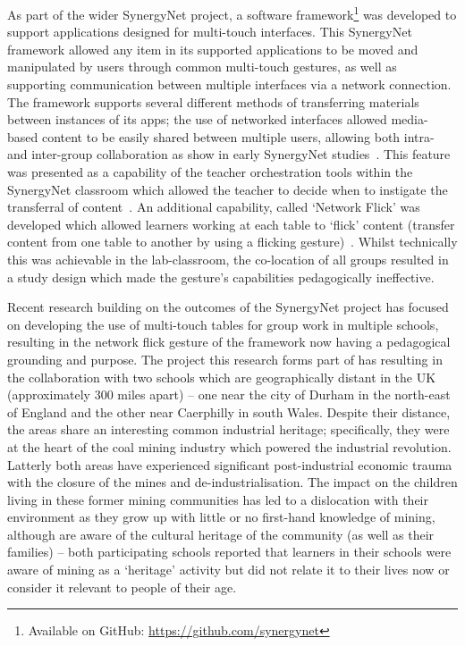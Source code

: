 \documentclass[a4paper,11pt]{article}
\begin{document}
As part of the wider SynergyNet project, a software framework\footnote{Available on GitHub: \url{https://github.com/synergynet}} was developed to support applications designed for multi-touch interfaces.
This SynergyNet framework allowed any item in its supported applications to be moved and manipulated by users through common multi-touch gestures, as well as supporting communication between multiple interfaces via a network connection.
The framework supports several different methods of transferring materials between instances of its apps; the use of networked interfaces allowed media-based content to be easily shared between multiple users, allowing both intra- and inter-group collaboration as show in early SynergyNet studies~\cite{mercier:2014b}.
This feature was presented as a capability of the teacher orchestration tools within the SynergyNet classroom which allowed the teacher to decide when to instigate the transferral of content~\cite{alagha-et-al:2010,mercier:2016}.
An additional capability, called `Network Flick' was developed which allowed learners working at each table to ‘flick’ content (transfer content from one table to another by using a flicking gesture)~\cite{reetz-et-al:2006}.
Whilst technically this was achievable in the lab-classroom, the co-location of all groups resulted in a study design which made the gesture’s capabilities pedagogically ineffective.

Recent research building on the outcomes of the SynergyNet project has focused on developing the use of multi-touch tables for group work in multiple schools, resulting in the network flick gesture of the framework now having a pedagogical grounding and purpose.
The project this research forms part of has resulting in the collaboration with two schools which are geographically distant in the UK (approximately 300 miles apart) -- one near the city of Durham in the north-east of England and the other near Caerphilly in south Wales.
Despite their distance, the areas share an interesting common industrial heritage; specifically, they were at the heart of the coal mining industry which powered the industrial revolution.
Latterly both areas have experienced significant post-industrial economic trauma with the closure of the mines and de-industrialisation.
The impact on the children living in these former mining communities has led to a dislocation with their environment as they grow up with little or no first-hand knowledge of mining, although are aware of the cultural heritage of the community (as well as their families) -- both participating schools reported that learners in their schools were aware of mining as a ‘heritage’ activity but did not relate it to their lives now or consider it relevant to people of their age.
\end{document}
